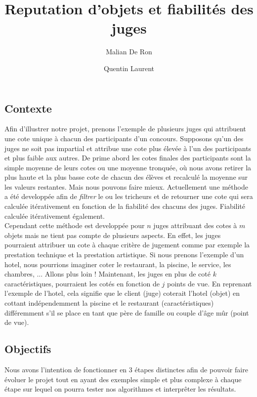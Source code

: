 \documentclass[12pt,a4paper,notitlepage]{article}
\title{Reputation d'objets et fiabilités des juges}
\author{Malian De Ron \and Quentin Laurent}
\begin{document}
\maketitle

\subsection*{Contexte}

Afin d'illustrer notre projet, prenons l'exemple de plusieurs juges qui attribuent une cote unique à chacun des participants d'un concours. Supposons qu'un des juges ne soit pas impartial et attribue une cote plus élevée à l'un des participants et plus faible aux autres. De prime abord les cotes finales des participants sont la simple moyenne de leurs cotes ou une moyenne tronquée, où nous avons retirer la plus haute et la plus basse cote de chacun des élèves et recalculé la moyenne sur les valeurs restantes. Mais nous pouvons faire mieux. Actuellement une méthode a été developpée afin de \textit{filtrer} le ou les tricheurs et de retourner une cote qui sera calculée itérativement en fonction de la fiabilité des chacuns des juges. Fiabilité calculée itérativement également.\\

Cependant cette méthode est developpée pour $n$ juges attribuant des cotes à $m$ objets mais ne tient pas compte de plusieurs aspects. En effet, les juges pourraient attribuer un cote à chaque critère de jugement comme par exemple la prestation technique et la prestation artistique. Si nous prenons l'exemple d'un hotel, nous pourrions imaginer coter le restaurant, la piscine, le service, les chambres, ... Allons plus loin ! Maintenant, les juges en plus de coté $k$ caractéristiques, pourraient les cotés en fonction de $j$ points de vue. En reprenant l'exemple de l'hotel, cela signifie que le client (juge) coterait l'hotel (objet) en cottant indépendemment la piscine  et le restaurant (caractéristiques) différemment s'il se place en tant que père de famille ou couple d'âge mûr (point de vue).
\subsection*{Objectifs}

Nous avons l'intention de fonctionner en 3 étapes distinctes afin de pouvoir faire évoluer le projet tout en ayant des exemples simple et plus complexe à chaque étape sur lequel on pourra tester nos algorithmes et interprêter les résultats.\\
\end{document}
